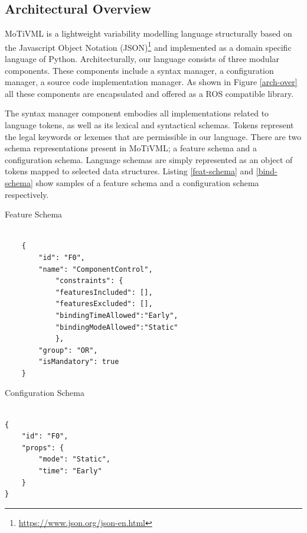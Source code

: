 \documentclass[conference]{IEEEtran}
\newcommand{\foot}[1]{\footnote{\url{#1}}}
\begin{document}
\subsection{Architectural Overview}
MoTiVML is a lightweight variability modelling language structurally based on the Javascript Object Notation (JSON)\foot{https://www.json.org/json-en.html} and implemented as a domain specific language of Python. Architecturally, our language consists of three modular components. These components include a syntax manager, a configuration manager, a source code implementation manager. As shown in Figure \ref{arch-over} all these components are encapsulated and offered as a ROS compatible library.

The syntax manager component embodies all implementations related to language tokens, as well as its lexical and syntactical schemas. Tokens represent the legal keywords or lexemes that are permissible in our language. There are two schema representations present in MoTiVML; a feature schema and a configuration schema. Language schemas are simply represented as an object of tokens mapped to selected data structures. Listing \ref{feat-schema} and \ref{bind-schema} show samples of a feature schema and a configuration schema respectively.

\begin{listing}
\caption{Feature Schema}
\begin{verbatim}

    {
        "id": "F0",
        "name": "ComponentControl",
            "constraints": {
            "featuresIncluded": [],
            "featuresExcluded": [],
            "bindingTimeAllowed":"Early",
            "bindingModeAllowed":"Static"
            },
        "group": "OR",
        "isMandatory": true
    }

\end{verbatim}
\label{feat-schema}
\end{listing}

\begin{listing}
\caption{Configuration Schema}
\begin{verbatim}

{
    "id": "F0",
    "props": {
        "mode": "Static",
        "time": "Early"
    }
}
\end{verbatim}
\label{bind-schema}
\end{listing}
\end{document}
